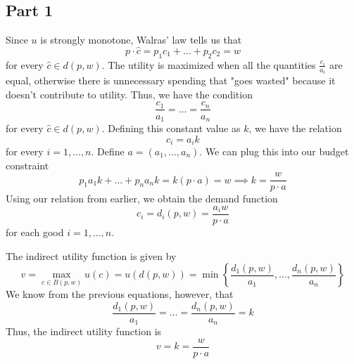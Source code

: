 \documentclass[12pt]{extarticle}
\numberwithin{table}{section}
\numberwithin{figure}{section}
\numberwithin{equation}{section}
\begin{document}
\subsection*{Part 1}
Since $u$ is strongly monotone, Walras' law tells us that
\begin{equation}
    p \cdot \hat c = p_1c_1 + \dots + p_2 c_2 = w
\end{equation}
for every $\hat c \in d(p, w)$.
The utility is maximized when all the quantities $\frac{c_i}{a_i}$ are equal,
otherwise there is unnecessary spending that "goes wasted" because it doesn't contribute to utility.
Thus, we have the condition
\begin{equation}
    \frac{c_1}{a_1} = \dots = \frac{c_n}{a_n}
\end{equation}
for every $\hat c \in d(p, w)$.
Defining this constant value as $k$, we have the relation
\begin{equation}
    c_i = a_i k
\end{equation}
for every $i = 1, ..., n$.
Define $a = (a_1, ..., a_n)$. We can plug this into our budget constraint
\begin{equation}
    p_1 a_1 k + \dots + p_n a_n k = k(p \cdot a) = w \implies k = \frac{w}{p \cdot a}
\end{equation}
Using our relation from earlier, we obtain the demand function
\begin{equation}
    c_i = d_i(p, w) = \frac{a_i w}{p \cdot a}
\end{equation}
for each good $i = 1, ..., n$.

The indirect utility function is given by
\begin{equation}
    v = \max_{c \in B(p, w)} u(c) = u(d(p, w)) = \min\left\{\frac{d_1(p, w)}{a_1}, ..., \frac{d_n(p, w)}{a_n}\right\}
\end{equation}
We know from the previous equations, however, that
\begin{equation}
    \frac{d_1(p, w)}{a_1} = \dots = \frac{d_n(p, w)}{a_n} = k
\end{equation}
Thus, the indirect utility function is
\begin{equation}
    v = k = \frac{w}{p \cdot a}
\end{equation}
\end{document}
